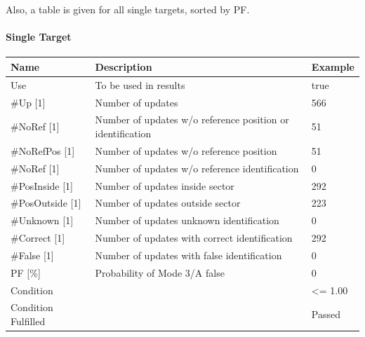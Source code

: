Also, a table is given for all single targets, sorted by PF.

\paragraph{Single Target}

\begin{center}
 \begin{table}[H]
  \begin{tabularx}{\textwidth}{ | l | X |  l | }
    \hline
    \textbf{Name} & \textbf{Description} & \textbf{Example} \\ \hline
    Use & To be used in results & true \\ \hline
    \#Up [1] & Number of updates & 566 \\ \hline
    \#NoRef [1] & Number of updates w/o reference position or identification & 51 \\ \hline
    \#NoRefPos [1] & Number of updates w/o reference position  & 51 \\ \hline
    \#NoRef [1] & Number of updates w/o reference identification & 0 \\ \hline
    \#PosInside [1] & Number of updates inside sector & 292 \\ \hline
    \#PosOutside [1] & Number of updates outside sector & 223 \\ \hline
    \#Unknown [1] & Number of updates unknown identification & 0 \\ \hline
    \#Correct [1] & Number of updates with correct identification & 292 \\ \hline
    \#False [1] & Number of updates with false identification & 0 \\ \hline
    PF [\%] & Probability of Mode 3/A false & 0 \\ \hline
    Condition &  & <= 1.00 \\ \hline
    Condition Fulfilled &  & Passed \\ \hline
\end{tabularx}
\end{table}
\end{center}

